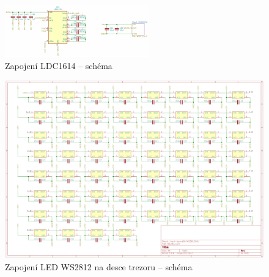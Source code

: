 \begin{figure}[htbp]
    \centering
    \includegraphics[width=\textwidth]{kapitoly/ctvrta_elektronicka_varianta/E4_zapojeni/next_board.pdf}
    \caption{Zapojení LDC1614 -- schéma}
    \label{fig:E4-sch_next-board}
\end{figure}
\begin{figure}[htbp]
    \centering
    \includegraphics[width=\textwidth]{kapitoly/ctvrta_elektronicka_varianta/E4_zapojeni/WS2812.pdf}
    \caption{Zapojení LED WS2812 na desce trezoru -- schéma}
    \label{fig:E4-sch_WS2812}
\end{figure}